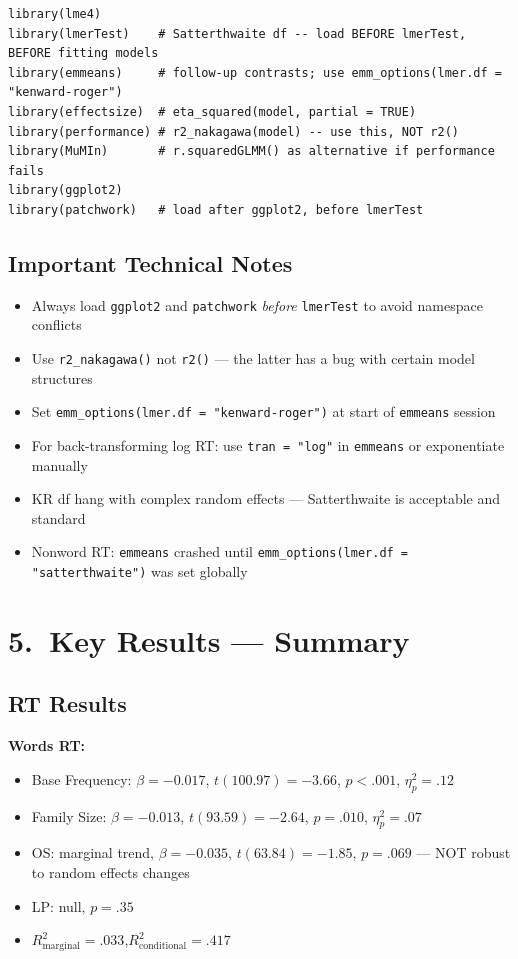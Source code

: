 \documentclass[11pt, a4paper]{article}
\begin{document}
\begin{lstlisting}
library(lme4)
library(lmerTest)    # Satterthwaite df -- load BEFORE lmerTest, BEFORE fitting models
library(emmeans)     # follow-up contrasts; use emm_options(lmer.df = "kenward-roger")
library(effectsize)  # eta_squared(model, partial = TRUE)
library(performance) # r2_nakagawa(model) -- use this, NOT r2()
library(MuMIn)       # r.squaredGLMM() as alternative if performance fails
library(ggplot2)
library(patchwork)   # load after ggplot2, before lmerTest
\end{lstlisting}

\subsection{Important Technical Notes}

\begin{itemize}[leftmargin=1.5em]
  \item Always load \texttt{ggplot2} and \texttt{patchwork} \textit{before} \texttt{lmerTest} to avoid namespace conflicts
  \item Use \texttt{r2\_nakagawa()} not \texttt{r2()} — the latter has a bug with certain model structures
  \item Set \texttt{emm\_options(lmer.df = "kenward-roger")} at start of \texttt{emmeans} session
  \item For back-transforming log RT: use \texttt{tran = "log"} in \texttt{emmeans} or exponentiate manually
  \item KR df hang with complex random effects — Satterthwaite is acceptable and standard
  \item Nonword RT: \texttt{emmeans} crashed until \texttt{emm\_options(lmer.df = "satterthwaite")} was set globally
\end{itemize}

\section{5.\ Key Results — Summary}

\subsection{RT Results}

\textbf{Words RT:}
\begin{itemize}[leftmargin=1.5em]
  \item Base Frequency: $\beta = -0.017$, $t(100.97) = -3.66$, $p < .001$, $\eta^2_p = .12$
  \item Family Size: $\beta = -0.013$, $t(93.59) = -2.64$, $p = .010$, $\eta^2_p = .07$
  \item OS: marginal trend, $\beta = -0.035$, $t(63.84) = -1.85$, $p = .069$ — NOT robust to random effects changes
  \item LP: null, $p = .35$
  \item $R^2_\text{marginal} = .033$,\quad $R^2_\text{conditional} = .417$
\end{itemize}
\end{document}
